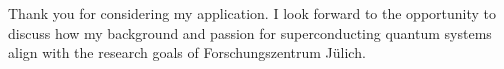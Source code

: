 \documentclass[12pt,stdletter,dateno]{newlfm}
\begin{document}
\begin{newlfm}
        Thank you for considering my application. I look forward to the opportunity to discuss how my background and passion for superconducting quantum systems align with the research goals of Forschungszentrum Jülich.
        
    \end{newlfm}
\end{document}
